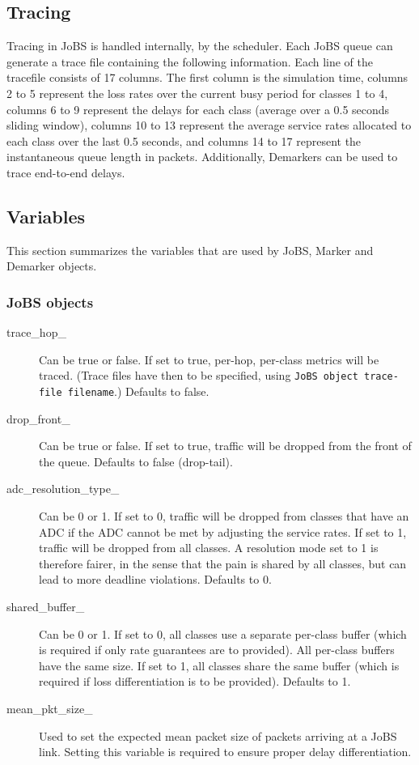 \subsection{Tracing}
Tracing in JoBS is handled internally, by the scheduler. 
Each JoBS queue can generate a 
trace file containing the following information.  
Each line of the tracefile consists of 17 columns. The first column is the 
simulation time, columns 2 to 5 represent the loss rates over the current busy 
period for classes 1 to 4, columns 6 to 9 represent the delays for each class 
(average over a 0.5 seconds sliding window), columns 10 to 13 represent the 
average service rates allocated to each class over the last 0.5 seconds, and 
columns 14 to 17 represent the instantaneous queue length in packets. 
Additionally, Demarkers can be used to trace end-to-end delays.

\subsection{Variables}
This section summarizes the variables that are used by JoBS, Marker and Demarker objects.
\subsubsection{JoBS objects}
\begin{description}
\item[trace\_hop\_] Can be true or false. If set to true, per-hop, per-class metrics will be traced. (Trace files have then to be specified, using {\tt \<JoBS object\> trace-file \<filename\>}.) Defaults to false.
\item[drop\_front\_] Can be true or false. If set to true, traffic will be dropped from the front of the queue. Defaults to false (drop-tail).
\item[adc\_resolution\_type\_] Can be 0 or 1. 
If set to 0, traffic will be dropped from classes that have an ADC if the ADC 
cannot be met by adjusting the service rates. If set to 1, traffic will be 
dropped from all classes. A resolution mode set to 
1 is therefore fairer, in the sense that the pain is shared by all classes, 
but can lead to more deadline violations. Defaults to 0.
\item[shared\_buffer\_] Can be 0 or 1. If set to 0, all classes use a separate 
per-class 
buffer (which is required if only rate guarantees are to provided). All 
per-class buffers have the same size. 
If set to 
1, all classes share the same buffer (which is required if loss differentiation
is to be provided). Defaults to 1.
\item[mean\_pkt\_size\_] 
Used to set the expected mean packet size of packets arriving at a JoBS link. 
Setting this variable is required to ensure proper delay differentiation.
\end{description}
